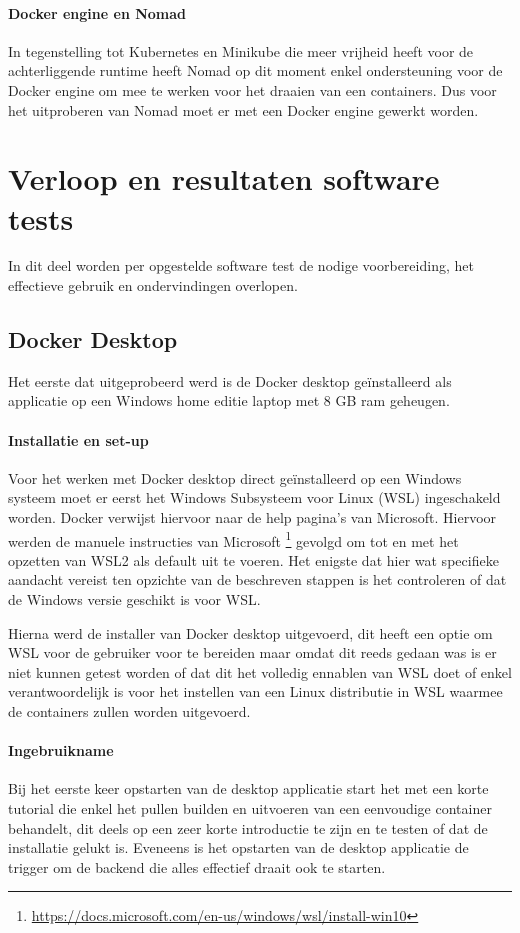 \paragraph{Docker engine en Nomad}
In tegenstelling tot Kubernetes en Minikube die meer vrijheid heeft voor de achterliggende runtime heeft Nomad op dit moment enkel ondersteuning voor de Docker engine om mee te werken voor het draaien van een containers. Dus voor het uitproberen van Nomad moet er met een Docker engine gewerkt worden.

\section{Verloop en resultaten software tests}
In dit deel worden per opgestelde software test de nodige voorbereiding, het effectieve gebruik en ondervindingen overlopen. 

\subsection{Docker Desktop} \label{DockerDesktop}
Het eerste dat uitgeprobeerd werd is de Docker desktop geïnstalleerd als applicatie op een Windows home editie laptop met 8 GB ram geheugen.

\paragraph{Installatie en set-up}
Voor het werken met Docker desktop direct geïnstalleerd op een Windows systeem moet er eerst het Windows Subsysteem voor Linux (WSL) ingeschakeld worden. Docker verwijst hiervoor naar de help pagina’s van Microsoft. Hiervoor werden de manuele instructies van Microsoft \footnote{\url{https://docs.microsoft.com/en-us/windows/wsl/install-win10}} gevolgd om tot en met het opzetten van WSL2 als default uit te voeren. Het enigste dat hier wat specifieke aandacht vereist ten opzichte van de beschreven stappen is het controleren of dat de Windows versie geschikt is voor WSL.

Hierna werd de installer van Docker desktop uitgevoerd, dit heeft een optie om WSL voor de gebruiker voor te bereiden maar omdat dit reeds gedaan was is er niet kunnen getest worden of dat dit het volledig ennablen van WSL doet of enkel verantwoordelijk is voor het instellen van een Linux distributie in WSL waarmee de containers zullen worden uitgevoerd.


\paragraph{Ingebruikname}
Bij het eerste keer opstarten van de desktop applicatie start het met een korte tutorial die enkel het pullen builden en uitvoeren van een eenvoudige container behandelt, dit deels op een zeer korte introductie te zijn en te testen of dat de installatie gelukt is. Eveneens is het opstarten van de desktop applicatie de trigger om de backend die alles effectief draait ook te starten.

